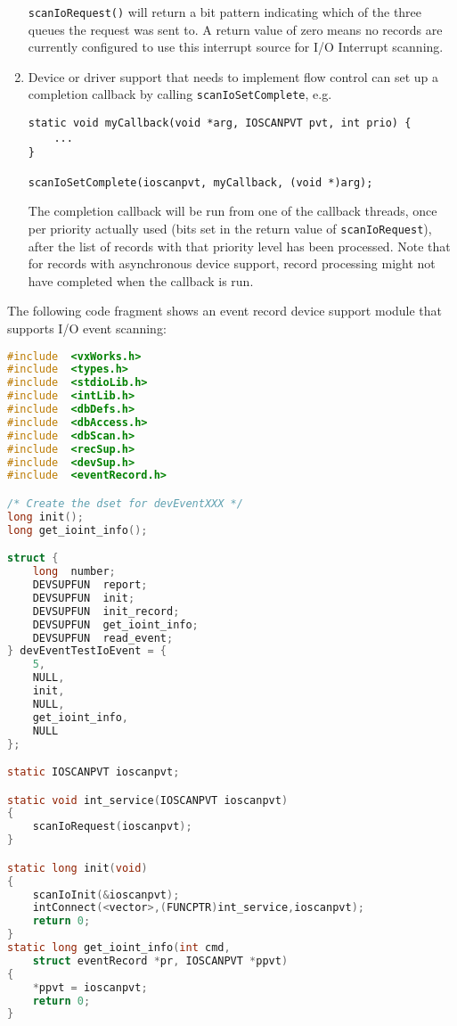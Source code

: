 \begin{enumerate}
\verb|scanIoRequest()| will return a bit pattern indicating which of the three queues the request was sent to.
A return value of zero means no records are currently configured to use this interrupt source for I/O Interrupt scanning.

\item Device or driver support that needs to implement flow control can set up a completion callback by calling \verb|scanIoSetComplete|, e.g.

\begin{verbatim}
static void myCallback(void *arg, IOSCANPVT pvt, int prio) {
    ...
}

scanIoSetComplete(ioscanpvt, myCallback, (void *)arg);
\end{verbatim}

The completion callback will be run from one of the callback threads, once per priority actually used (bits set in the return value of \verb|scanIoRequest|), after the list of records with that priority level has been processed.
Note that for records with asynchronous device support, record processing might not have completed when the callback is run.
\end{enumerate}

The following code fragment shows an event record device support module that supports I/O event scanning: 

\begin{lstlisting}[language=C]
#include  <vxWorks.h>
#include  <types.h>
#include  <stdioLib.h>
#include  <intLib.h>
#include  <dbDefs.h>
#include  <dbAccess.h>
#include  <dbScan.h>
#include  <recSup.h>
#include  <devSup.h>
#include  <eventRecord.h>

/* Create the dset for devEventXXX */
long init();
long get_ioint_info();

struct {
    long  number;
    DEVSUPFUN  report;
    DEVSUPFUN  init;
    DEVSUPFUN  init_record;
    DEVSUPFUN  get_ioint_info;
    DEVSUPFUN  read_event;
} devEventTestIoEvent = {
    5,
    NULL,
    init,
    NULL,
    get_ioint_info,
    NULL
};

static IOSCANPVT ioscanpvt;

static void int_service(IOSCANPVT ioscanpvt)
{
    scanIoRequest(ioscanpvt);
}

static long init(void)
{
    scanIoInit(&ioscanpvt);
    intConnect(<vector>,(FUNCPTR)int_service,ioscanpvt);
    return 0;
}
static long get_ioint_info(int cmd,
    struct eventRecord *pr, IOSCANPVT *ppvt)
{
    *ppvt = ioscanpvt;
    return 0;
}
\end{lstlisting}

